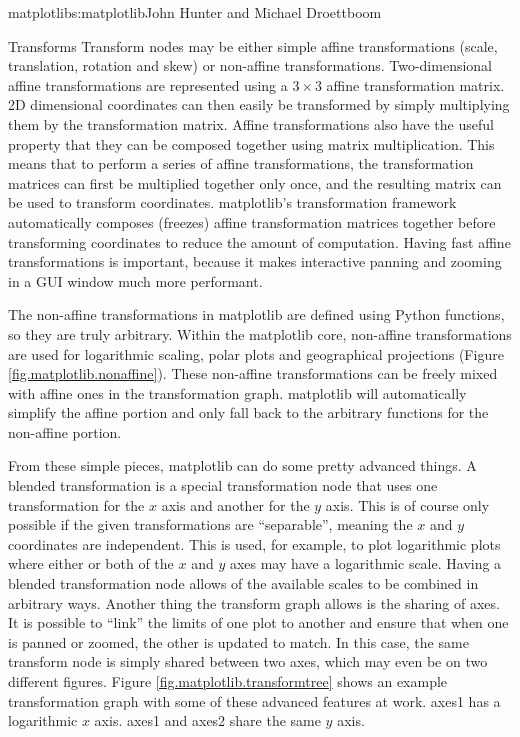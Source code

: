\begin{aosachapter}{matplotlib}{s:matplotlib}{John Hunter and Michael Droettboom}
\begin{aosasect1}{Transforms}
Transform nodes may be either simple affine transformations (scale,
translation, rotation and skew) or non-affine transformations.
Two-dimensional affine transformations are represented using a $3
\times 3$ affine transformation matrix.  2D dimensional coordinates
can then easily be transformed by simply multiplying them by the
transformation matrix.  Affine transformations also have the useful
property that they can be composed together using matrix
multiplication.  This means that to perform a series of affine
transformations, the transformation matrices can first be multiplied
together only once, and the resulting matrix can be used to transform
coordinates.  matplotlib's transformation framework automatically
composes (freezes) affine transformation matrices together before
transforming coordinates to reduce the amount of computation.  Having
fast affine transformations is important, because it makes interactive
panning and zooming in a GUI window much more performant.

The non-affine transformations in matplotlib are defined using Python
functions, so they are truly arbitrary.  Within the matplotlib core,
non-affine transformations are used for logarithmic scaling, polar
plots and geographical projections (Figure
\ref{fig.matplotlib.nonaffine}).  These non-affine transformations can
be freely mixed with affine ones in the transformation graph.
matplotlib will automatically simplify the affine portion and only
fall back to the arbitrary functions for the non-affine portion.


From these simple pieces, matplotlib can do some pretty advanced
things.  A blended transformation is a special transformation node
that uses one transformation for the $x$ axis and another for the $y$
axis.  This is of course only possible if the given transformations
are ``separable'', meaning the $x$ and $y$ coordinates are
independent.  This is used, for example, to plot logarithmic plots
where either or both of the $x$ and $y$ axes may have a logarithmic
scale.  Having a blended transformation node allows of the available
scales to be combined in arbitrary ways.  Another thing the transform
graph allows is the sharing of axes.  It is possible to ``link'' the
limits of one plot to another and ensure that when one is panned or
zoomed, the other is updated to match.  In this case, the same
transform node is simply shared between two axes, which may even be on
two different figures.  Figure \ref{fig.matplotlib.transformtree}
shows an example transformation graph with some of these advanced
features at work.  axes1 has a logarithmic $x$ axis.  axes1 and axes2
share the same $y$ axis.


\end{aosasect1}
\end{aosachapter}
